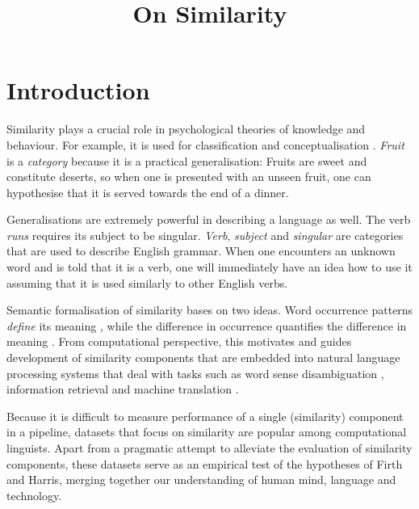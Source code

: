 \documentclass[11pt]{article}
\title{On Similarity}
\date{}
\begin{document}
\maketitle

\begin{abstract}

\end{abstract}

\section{Introduction}
\label{sec:introduction}

Similarity plays a crucial role in psychological theories of knowledge and behaviour. For example, it is used for classification and conceptualisation \cite{Tversky1977}. \textit{Fruit} is a \emph{category} because it is a practical generalisation: Fruits are sweet and constitute deserts, so when one is presented with an unseen fruit, one can hypothesise that it is served towards the end of a dinner.

Generalisations are extremely powerful in describing a language as well. The verb \textit{runs} requires its subject to be singular. \textit{Verb}, \textit{subject} and \textit{singular} are categories that are used to describe English grammar. When one encounters an unknown word and is told that it is a verb, one will immediately have an idea how to use it assuming that it is used similarly to other English verbs.

Semantic formalisation of similarity bases on two ideas. Word occurrence patterns \emph{define} its meaning \cite{firth1957lingtheory}, while the difference in occurrence \textup{quantifies} the difference in meaning \cite{harris1954distributional}. From computational perspective, this motivates and guides development of similarity components that are embedded into natural language processing systems that deal with tasks such as word sense disambiguation \cite{Schutze:1998:AWS:972719.972724}, information retrieval \cite{Salton:1975:VSM:361219.361220} and machine translation \cite{Dagan:1993:CWS:981574.981596}.

Because it is difficult to measure performance of a single (similarity) component in a pipeline, datasets that focus on similarity are popular among computational linguists. Apart from a pragmatic attempt to alleviate the evaluation of similarity components, these datasets serve as an empirical test of the hypotheses of Firth and Harris, merging together our understanding of human mind, language and technology.
\end{document}
